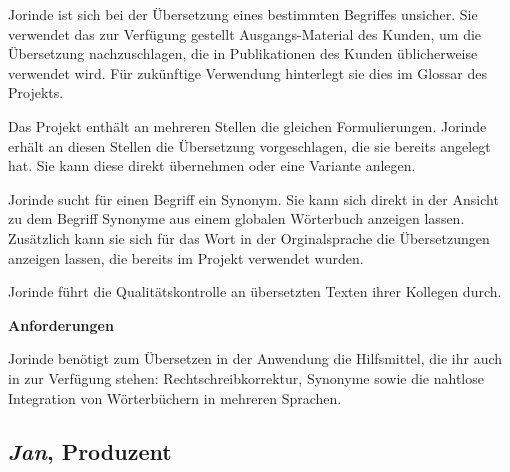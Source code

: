 \begin{multicols}{2}
Jorinde ist sich bei der Übersetzung eines bestimmten Begriffes unsicher. Sie verwendet das zur Verfügung gestellt Ausgangs-Material des Kunden, um die Übersetzung nachzuschlagen, die in Publikationen des Kunden üblicherweise verwendet wird. Für zukünftige Verwendung hinterlegt sie dies im Glossar des Projekts.

Das Projekt enthält an mehreren Stellen die gleichen Formulierungen. Jorinde erhält an diesen Stellen die Übersetzung vorgeschlagen, die sie bereits angelegt hat. Sie kann diese direkt übernehmen oder eine Variante anlegen.

Jorinde sucht für einen Begriff ein Synonym. Sie kann sich direkt in der Ansicht zu dem Begriff Synonyme aus einem globalen Wörterbuch anzeigen lassen. Zusätzlich kann sie sich für das Wort in der Orginalsprache die Übersetzungen anzeigen lassen, die bereits im Projekt verwendet wurden.

Jorinde führt die Qualitätskontrolle an übersetzten Texten ihrer Kollegen durch.

\textbf{Anforderungen}

Jorinde benötigt zum Übersetzen in der Anwendung die Hilfsmittel, die ihr auch in  zur Verfügung stehen: Rechtschreibkorrektur, Synonyme sowie die nahtlose Integration von Wörterbüchern in mehreren Sprachen.

\end{multicols}

\pagebreak

\subsection{\emph{Jan}, Produzent}\label{p:jan}

